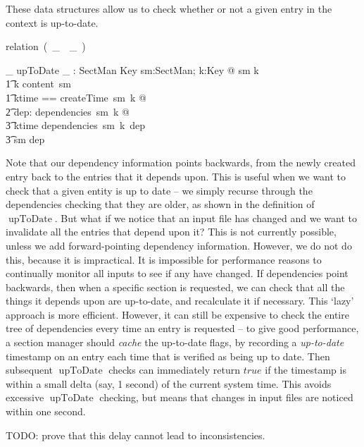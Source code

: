 \documentclass{llncs} %
\newcommand{\relation}{\mbox{relation }}
\newcommand{\varg}{~\_~}
\begin{document}
These data structures allow us to check whether or not a given entry
in the context is up-to-date.

\newcommand{\upToDate}{\mathrel{\mbox{upToDate}}}
\begin{zed}
  \relation (\varg \upToDate \varg)
\end{zed}
\begin{axdef}
  \_ upToDate \_ : SectMan \rel Key
\where
  \forall sm:SectMan; k:Key @ sm \upToDate k \iff \\
  \t1 k \in \dom content~sm \land \\
  \t1 \exists ktime == createTime~sm~k @ \\
  \t2   \forall dep: \dom dependencies~sm~k @ \\
  \t3     ktime \before dependencies~sm~k~dep \land \\
  \t3     sm \upToDate dep
\end{axdef} 

Note that our dependency information points backwards,
from the newly created entry back to the entries that it
depends upon.  This is useful when we want to check that a
given entity is up to date -- we simply recurse through
the dependencies checking that they are older, as shown
in the definition of $\upToDate$.  But what if we notice
that an input file has changed and we want to invalidate
all the entries that depend upon it?  This is not currently
possible, unless we add forward-pointing dependency information.
However, we do not do this, because it is impractical. 
It is impossible for performance reasons to continually monitor all inputs
to see if any have changed.  If dependencies point backwards, then when a
specific section is requested, we can check that all the things it depends
upon are up-to-date, and recalculate it if necessary.  This `lazy' approach
is more efficient.  However, it can still be expensive to check the
entire tree of dependencies every time an entry is requested -- to give
good performance, a section manager should \emph{cache} the up-to-date
flags, by recording a \emph{up-to-date} timestamp on an entry each time
that is verified as being up to date.  Then subsequent $\upToDate$
checks can immediately return $true$ if the timestamp is within a
small delta (say, 1 second) of the current system time.  This avoids
excessive $\upToDate$ checking, but means that changes in input files
are noticed within one second.

TODO: prove that this delay cannot lead to inconsistencies.
\end{document}
